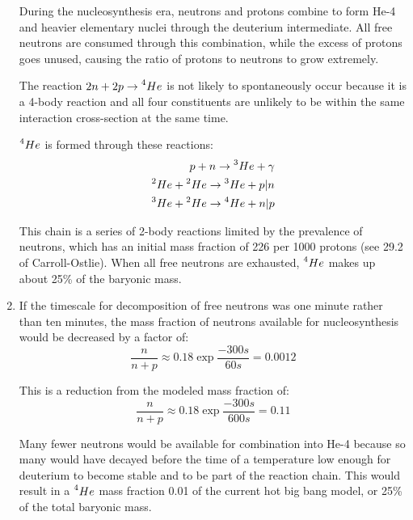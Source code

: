 \documentclass{paper}
\begin{document}
\begin{enumerate}
      During the nucleosynthesis era, neutrons and protons combine to form
      He-4 and heavier elementary nuclei through the deuterium intermediate.
      All free neutrons are consumed through this combination, while the
      excess of protons goes unused, causing the ratio of protons to neutrons
      to grow extremely.

      The reaction \(2n + 2p \rightarrow \prescript{4}{}{He}\) is not likely to spontaneously
      occur because it is a 4-body reaction and all four constituents are
      unlikely to be within the same interaction cross-section at the same
      time.

      \(\prescript{4}{}{He}\) is formed through these reactions:
      \begin{equation}
        \begin{split}
          p + n \rightarrow \prescript{3}{}{He} + \gamma          \\
          \prescript{2}{}{He} + \prescript{2}{}{He} \rightarrow   
            \prescript{3}{}{He} + p | n     \\
          \prescript{3}{}{He} + \prescript{2}{}{He} \rightarrow   
            \prescript{4}{}{He} + n | p
        \end{split}
      \end{equation}

      This chain is a series of 2-body reactions limited by the prevalence
      of neutrons, which has an initial mass fraction of 226 per 1000 protons
      (see 29.2 of Carroll-Ostlie\cite{Carroll-Ostlie}). When all free 
      neutrons are exhausted, \(\prescript{4}{}{He}\) makes up about 25\% of 
      the baryonic mass.

    \item %
      If the timescale for decomposition of free neutrons was one minute 
      rather than ten minutes, the mass fraction of neutrons available for
      nucleosynthesis would be decreased by a factor of:
      \[
        \frac{n}{n+p} \approx 0.18 \exp{\frac{-300\si{s}}{60\si{s}}} = 0.0012
      \]
      
      This is a reduction from the modeled mass fraction of:
      \[
        \frac{n}{n+p} \approx 0.18 \exp{\frac{-300\si{s}}{600\si{s}}} = 0.11
      \]

      Many fewer neutrons would be available for combination into He-4 
      because so many would have decayed before the time of a temperature low
      enough for deuterium to become stable and to be part of the reaction
      chain. This would result in a \(\prescript{4}{}{He}\) mass fraction 0.01 
      of the current hot big bang model, or 25\% of the total baryonic mass.


\end{enumerate}
\end{document}
